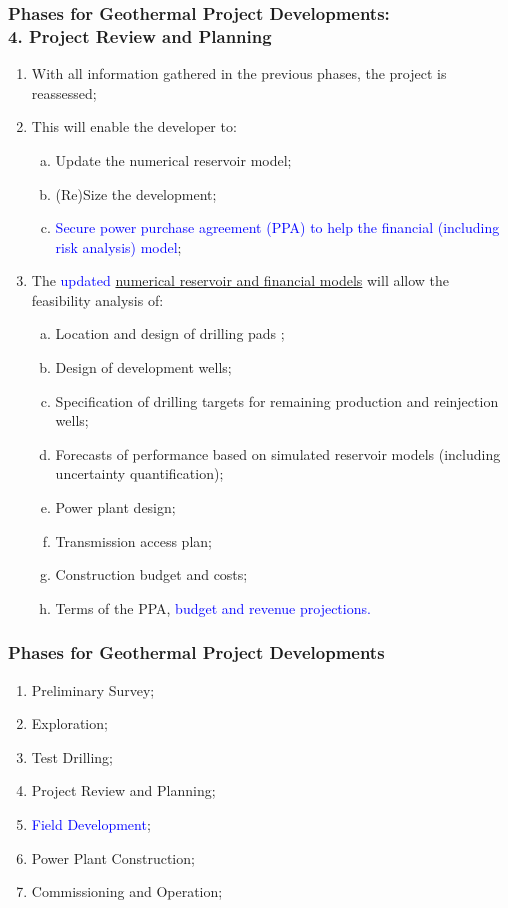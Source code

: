 \documentclass[10pt,compress]{beamer}
\newcommand{\blue}{\textcolor{blue}}
\begin{document}
\begin{frame}
\begin{frame}
 \frametitle{Phases for Geothermal Project Developments: \\ 4. Project Review and Planning}
    \begin{enumerate}[{4.}1]\scriptsize
       \item <1-> With all information gathered in the previous phases, the project is reassessed;
       \item <2-> This will enable the developer to:
          \begin{enumerate}[(a)]\scriptsize
             \item<2-> Update the numerical reservoir model;
             \item<2-> (Re)Size the development;
             \item<2-> \blue{Secure power purchase agreement (PPA) to help the financial (including risk analysis) model};
          \end{enumerate}
       \item <3-> The \blue{updated} \underline{numerical reservoir and financial models} will allow the feasibility analysis of:
          \begin{enumerate}[(a)]\scriptsize
             \item<3-> Location and design of drilling pads ;
             \item<3-> Design of development wells;
             \item<3-> Specification of drilling targets for remaining production and reinjection wells;
             \item<3-> Forecasts of performance based on simulated reservoir models (including uncertainty quantification);
             \item<3-> Power plant design;
             \item<3-> Transmission access plan;
             \item<3-> Construction budget and costs;
             \item<3-> Terms of the PPA, \blue{budget and revenue projections.}
          \end{enumerate}
    \end{enumerate}
\end{frame}
 


\begin{frame}
 \frametitle{Phases for Geothermal Project Developments} 
    \begin{enumerate}[1.]
       \item <1-> Preliminary Survey;
       \item <1-> Exploration; 
       \item <1-> Test Drilling;
       \item <1-> Project Review and Planning;
       \item <2-> \blue{Field Development}; 
       \item <1-> Power Plant Construction;
       \item <1-> Commissioning and Operation;
    \end{enumerate}
\end{frame}



\end{frame}
\end{document}
